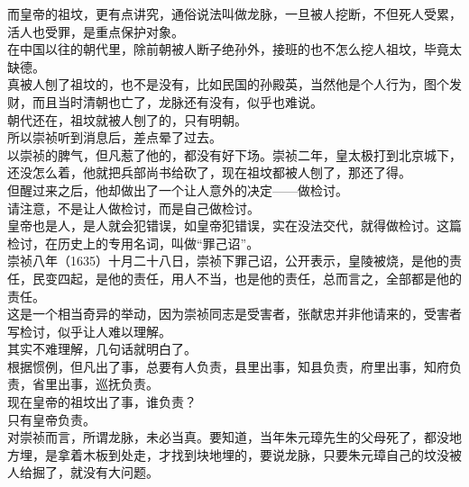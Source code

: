 \begin{multicols}{\theparacolNo}
而皇帝的祖坟，更有点讲究，通俗说法叫做龙脉，一旦被人挖断，不但死人受累，活人也受罪，是重点保护对象。\\

在中国以往的朝代里，除前朝被人断子绝孙外，接班的也不怎么挖人祖坟，毕竟太缺德。\\

真被人刨了祖坟的，也不是没有，比如民国的孙殿英，当然他是个人行为，图个发财，而且当时清朝也亡了，龙脉还有没有，似乎也难说。\\

朝代还在，祖坟就被人刨了的，只有明朝。\\

所以崇祯听到消息后，差点晕了过去。\\

以崇祯的脾气，但凡惹了他的，都没有好下场。崇祯二年，皇太极打到北京城下，还没怎么着，他就把兵部尚书给砍了，现在祖坟都被人刨了，那还了得。\\

但醒过来之后，他却做出了一个让人意外的决定——做检讨。\\

请注意，不是让人做检讨，而是自己做检讨。\\

皇帝也是人，是人就会犯错误，如皇帝犯错误，实在没法交代，就得做检讨。这篇检讨，在历史上的专用名词，叫做“罪己诏”。\\

崇祯八年（1635）十月二十八日，崇祯下罪己诏，公开表示，皇陵被烧，是他的责任，民变四起，是他的责任，用人不当，也是他的责任，总而言之，全部都是他的责任。\\

这是一个相当奇异的举动，因为崇祯同志是受害者，张献忠并非他请来的，受害者写检讨，似乎让人难以理解。\\

其实不难理解，几句话就明白了。\\

根据惯例，但凡出了事，总要有人负责，县里出事，知县负责，府里出事，知府负责，省里出事，巡抚负责。\\

现在皇帝的祖坟出了事，谁负责？\\

只有皇帝负责。\\

对崇祯而言，所谓龙脉，未必当真。要知道，当年朱元璋先生的父母死了，都没地方埋，是拿着木板到处走，才找到块地埋的，要说龙脉，只要朱元璋自己的坟没被人给掘了，就没有大问题。\\


\end{multicols}
